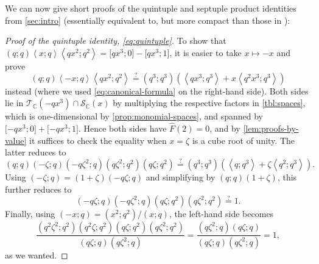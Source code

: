 \documentclass[reqno,11pt]{amsart}
\theoremstyle{definition}
\theoremstyle{remark}
\newtheorem*{remark}{Remark}
\numberwithin{equation}{section}
\newcommand{\C}{\mathbb{C}}
\newcommand{\Hminus}{{\mathbb{H}^{\textnormal{-}\hspace{-0.03cm}}}}
\newcommand{\mT}{\mathcal{T}}
\newcommand{\mS}{\mathcal{S}}
\newcommand{\la}{\left\langle}
\newcommand{\ra}{\right\rangle}
\newcommand{\vect}[2]{\big[{#1};{#2}\big]}
\renewcommand{\hat}{\widehat}
\begin{document}
We can now give short proofs of the quintuple and septuple product identities from \cref{sec:intro} (essentially equivalent to, but more compact than those in \cite{cao2012applications}):
\begin{proof}[Proof of the quintuple identity, \cref{eq:quintuple}]
To show that $(q; q) \la x; q\ra \la qx^2; q^2\ra = \vect{qx^3}{0} - \vect{qx^3}{1}$, it is easier to take $x \mapsto -x$ and prove 
\[
    (q; q) \la -x; q\ra \la qx^2; q^2\ra \stackrel{?}{=} \left(q^3; q^3\right)\left(\la qx^3; q^3 \ra + x\la q^2 x^3; q^3 \ra \right)
\]
instead (where we used \cref{eq:canonical-formula} on the right-hand side). Both sides lie in $\mT_\C\left(-qx^3\right) \cap \mS_\C\left(x\right)$ by multiplying the respective factors in \cref{tbl:spaces}, which is one-dimensional by \cref{prop:monomial-spaces}, and spanned by $\vect{-qx^3}{0} + \vect{-qx^3}{1}$. Hence both sides have $\hat{F}(2) = 0$, and by \cref{lem:proofs-by-value} it suffices to check the equality when $x = \zeta$ is a cube root of unity. The latter reduces to
\[
    (q; q) \left( -\zeta; q\right) \left( -q\zeta^2; q\right) 
    \left( q\zeta^2; q^2\right) \left( q\zeta; q^2\right) 
    \stackrel{?}{=} \left(q^3; q^3\right)\left(\la q; q^3 \ra + \zeta \la q^2; q^3 \ra \right).
\]
Using $(-\zeta; q) = (1 + \zeta)(-q\zeta; q)$ and simplifying by $(q; q)(1+\zeta)$, this further reduces to
\[
    \left( -q\zeta; q\right) \left( -q\zeta^2; q\right) 
    \left( q\zeta; q^2\right)\left( q\zeta^2; q^2\right)
    \stackrel{?}{=} 1.
\]
Finally, using $(-x; q) = \left(x^2; q^2\right)/(x; q)$, the left-hand side becomes \[
    \frac{\left( q^2\zeta^2; q^2\right) \left( q^2\zeta; q^2\right) 
    \left( q\zeta; q^2\right)\left( q\zeta^2; q^2\right)}
    {\left( q\zeta; q\right) \left( q\zeta^2; q\right)}
    =
    \frac{\left( q\zeta^2; q\right) \left( q\zeta; q\right)}
    {\left( q\zeta; q\right) \left( q\zeta^2; q\right)} = 1,
\]
as we wanted.
\end{proof}

\end{document}
